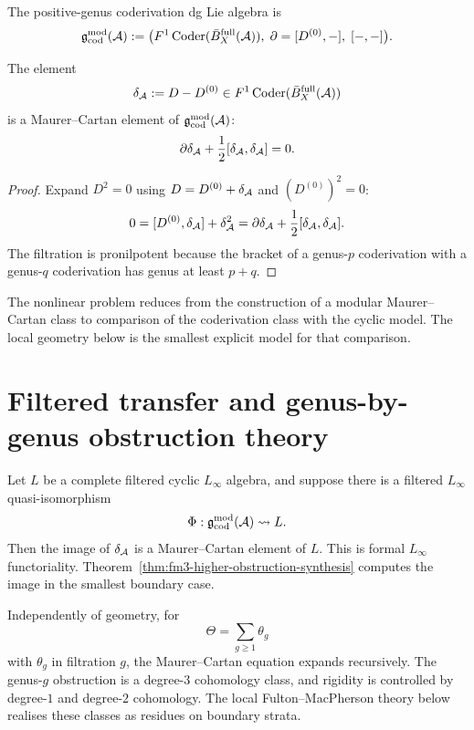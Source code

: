 \begin{definition}
The positive-genus coderivation dg Lie algebra is
\[
\mathfrak g^{\mathrm{mod}}_{\mathrm{cod}}(\mathcal A)
:=
\bigl(F^1\operatorname{Coder}(\bar B_X^{\mathrm{full}}(\mathcal A)),\; \partial=[D^{(0)},-],\;[-,-]\bigr).
\]
\end{definition}

\begin{theorem}
\label{thm:coderivation-MC-synthesis}
The element
\[
\delta_{\mathcal A}:=D-D^{(0)}
\in
F^1\operatorname{Coder}(\bar B_X^{\mathrm{full}}(\mathcal A))
\]
is a Maurer--Cartan element of $\mathfrak g^{\mathrm{mod}}_{\mathrm{cod}}(\mathcal A)$:
\[
\partial\delta_{\mathcal A}+\frac12[\delta_{\mathcal A},\delta_{\mathcal A}] = 0.
\]
\end{theorem}

\begin{proof}
Expand $D^2=0$ using $D=D^{(0)}+\delta_{\mathcal A}$ and $(D^{(0)})^2=0$:
\[
0 = [D^{(0)},\delta_{\mathcal A}] + \delta_{\mathcal A}^2
= \partial\delta_{\mathcal A}+\frac12[\delta_{\mathcal A},\delta_{\mathcal A}].
\]
The filtration is pronilpotent because the bracket of a genus-$p$ coderivation
with a genus-$q$ coderivation has genus at least $p+q$.
\end{proof}

The nonlinear problem reduces from the construction of a modular Maurer--Cartan
class to comparison of the coderivation class with the cyclic model. The local
geometry below is the smallest explicit model for that comparison.

\section{Filtered transfer and genus-by-genus obstruction theory}

Let $L$ be a complete filtered cyclic $L_\infty$ algebra, and suppose there is a
filtered $L_\infty$ quasi-isomorphism
\[
\Phi:\mathfrak g^{\mathrm{mod}}_{\mathrm{cod}}(\mathcal A)
\rightsquigarrow
L.
\]
Then the image of $\delta_{\mathcal A}$ is a Maurer--Cartan element of $L$.
This is formal $L_\infty$ functoriality. Theorem~\ref{thm:fm3-higher-obstruction-synthesis}
computes the image in the smallest boundary case.

Independently of geometry, for
\[
\Theta = \sum_{g\ge 1}\theta_g
\]
with $\theta_g$ in filtration $g$, the Maurer--Cartan equation expands
recursively. The genus-$g$ obstruction is a degree-$3$ cohomology class,
and rigidity is controlled by degree-$1$ and degree-$2$ cohomology. The local
Fulton--MacPherson theory below realises these classes as residues on boundary strata.

